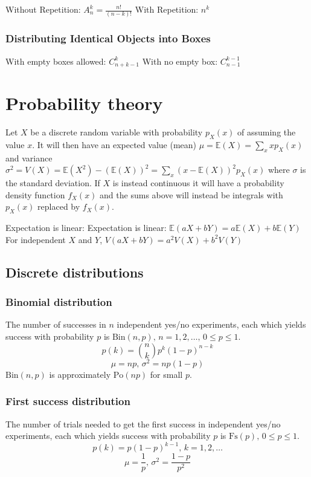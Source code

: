     Without Repetition: $A_n^k = \frac{n!}{(n - k)!}$
    With Repetition: $n^k$
    
    \subsubsection{Distributing Identical Objects into Boxes}  
    
    With empty boxes allowed: $C_{n+k-1}^k$
    With no empty box: $C_{n-1}^{k-1}$

\section{Probability theory}
Let $X$ be a discrete random variable with probability $p_X(x)$ of assuming the value $x$. It will then have an expected value (mean) $\mu=\mathbb{E}(X)=\sum_xxp_X(x)$ and variance $\sigma^2=V(X)=\mathbb{E}(X^2)-(\mathbb{E}(X))^2=\sum_x(x-\mathbb{E}(X))^2p_X(x)$ where $\sigma$ is the standard deviation. If $X$ is instead continuous it will have a probability density function $f_X(x)$ and the sums above will instead be integrals with $p_X(x)$ replaced by $f_X(x)$.

Expectation is linear:
Expectation is linear: $\mathbb{E}(aX+bY) = a\mathbb{E}(X)+b\mathbb{E}(Y)$ \\
For independent $X$ and $Y$, $V(aX+bY) = a^2V(X)+b^2V(Y)$

\subsection{Discrete distributions}

\subsubsection{Binomial distribution}
The number of successes in $n$ independent yes/no experiments, each which yields success with probability $p$ is $\textrm{Bin}(n,p),\,n=1,2,\dots,\, 0\leq p\leq1$.
\[p(k)=\binom{n}{k}p^k(1-p)^{n-k}\]
\[\mu = np,\,\sigma^2=np(1-p)\]
$\textrm{Bin}(n,p)$ is approximately $\textrm{Po}(np)$ for small $p$.

\subsubsection{First success distribution}
The number of trials needed to get the first success in independent yes/no experiments, each which yields success with probability $p$ is $\textrm{Fs}(p),\,0\leq p\leq1$.
\[p(k)=p(1-p)^{k-1},\,k=1,2,\dots\]
\[\mu = \frac1p,\,\sigma^2=\frac{1-p}{p^2}\]

